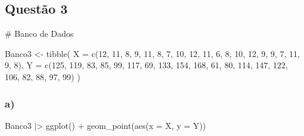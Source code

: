 \documentclass[
  letterpaper,
  DIV=11,
  numbers=noendperiod]{scrartcl}
\newenvironment{Shaded}{\begin{snugshade}}{\end{snugshade}}
\newcommand{\AttributeTok}[1]{\textcolor[rgb]{0.40,0.45,0.13}{#1}}
\newcommand{\CommentTok}[1]{\textcolor[rgb]{0.37,0.37,0.37}{#1}}
\newcommand{\DecValTok}[1]{\textcolor[rgb]{0.68,0.00,0.00}{#1}}
\newcommand{\FunctionTok}[1]{\textcolor[rgb]{0.28,0.35,0.67}{#1}}
\newcommand{\NormalTok}[1]{\textcolor[rgb]{0.00,0.23,0.31}{#1}}
\newcommand{\OtherTok}[1]{\textcolor[rgb]{0.00,0.23,0.31}{#1}}
\newcommand{\SpecialCharTok}[1]{\textcolor[rgb]{0.37,0.37,0.37}{#1}}
\begin{document}
\hypertarget{questuxe3o-3}{%
\subsection{Questão 3}\label{questuxe3o-3}}

\begin{Shaded}
\begin{Highlighting}[]
\CommentTok{\# Banco de Dados}

\NormalTok{Banco3 }\OtherTok{\textless{}{-}} \FunctionTok{tibble}\NormalTok{(}
  \AttributeTok{X =} \FunctionTok{c}\NormalTok{(}\DecValTok{12}\NormalTok{, }\DecValTok{11}\NormalTok{, }\DecValTok{8}\NormalTok{, }\DecValTok{9}\NormalTok{, }\DecValTok{11}\NormalTok{, }\DecValTok{8}\NormalTok{, }\DecValTok{7}\NormalTok{, }\DecValTok{10}\NormalTok{, }\DecValTok{12}\NormalTok{, }\DecValTok{11}\NormalTok{, }\DecValTok{6}\NormalTok{, }\DecValTok{8}\NormalTok{, }\DecValTok{10}\NormalTok{, }\DecValTok{12}\NormalTok{, }\DecValTok{9}\NormalTok{, }\DecValTok{9}\NormalTok{, }\DecValTok{7}\NormalTok{, }\DecValTok{11}\NormalTok{, }\DecValTok{9}\NormalTok{, }\DecValTok{8}\NormalTok{),}
  \AttributeTok{Y =} \FunctionTok{c}\NormalTok{(}\DecValTok{125}\NormalTok{, }\DecValTok{119}\NormalTok{, }\DecValTok{83}\NormalTok{, }\DecValTok{85}\NormalTok{, }\DecValTok{99}\NormalTok{, }\DecValTok{117}\NormalTok{, }\DecValTok{69}\NormalTok{, }\DecValTok{133}\NormalTok{, }\DecValTok{154}\NormalTok{, }\DecValTok{168}\NormalTok{, }\DecValTok{61}\NormalTok{, }\DecValTok{80}\NormalTok{, }\DecValTok{114}\NormalTok{, }\DecValTok{147}\NormalTok{, }\DecValTok{122}\NormalTok{, }\DecValTok{106}\NormalTok{, }\DecValTok{82}\NormalTok{, }\DecValTok{88}\NormalTok{, }\DecValTok{97}\NormalTok{, }\DecValTok{99}\NormalTok{)}
\NormalTok{                 )}
\end{Highlighting}
\end{Shaded}

\hypertarget{a}{%
\subsubsection{a)}\label{a}}

\begin{Shaded}
\begin{Highlighting}[]
\NormalTok{Banco3 }\SpecialCharTok{|\textgreater{}} 
  \FunctionTok{ggplot}\NormalTok{() }\SpecialCharTok{+}
  \FunctionTok{geom\_point}\NormalTok{(}\FunctionTok{aes}\NormalTok{(}\AttributeTok{x =}\NormalTok{ X, }\AttributeTok{y =}\NormalTok{ Y))}
\end{Highlighting}
\end{Shaded}
\end{document}
